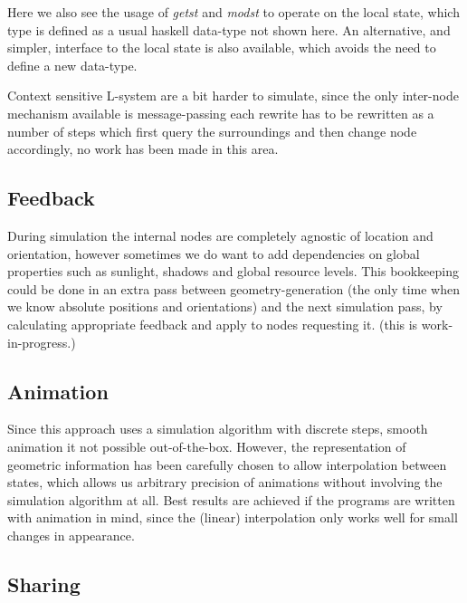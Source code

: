     Here we also see the usage of \emph{getst} and \emph{modst} to
    operate on the local state, which type is defined as a usual
    haskell data-type not shown here. An alternative, and simpler,
    interface to the local state is also available, which avoids the
    need to define a new data-type.

    Context sensitive L-system are a bit harder to
    simulate, since the only inter-node mechanism available is
    message-passing each rewrite has to be rewritten as a
    number of steps which first query the surroundings and
    then change node accordingly, no work has been made in
    this area.



\subsection{Feedback}

\label{monadic:feedback}

    During simulation the internal nodes are completely agnostic of
    location and orientation, however sometimes we do want to add
    dependencies on global properties such as sunlight, shadows and
    global resource levels.
    This bookkeeping could be done in an extra pass between
    geometry-generation (the only time when we know absolute positions
    and orientations) and the next simulation pass, by calculating
    appropriate feedback and apply to nodes requesting it.
    (this is work-in-progress.)

\subsection{Animation}

\label{monadic:animation}

    Since this approach uses a simulation algorithm with discrete
    steps, smooth animation it not possible out-of-the-box. However,
    the representation of geometric information has been carefully
    chosen to allow interpolation between states, which allows us
    arbitrary precision of animations without involving the simulation
    algorithm at all. Best results are achieved if the
    programs are written with animation in mind, since the (linear)
    interpolation only works well for small changes in appearance. 


\subsection{Sharing}

